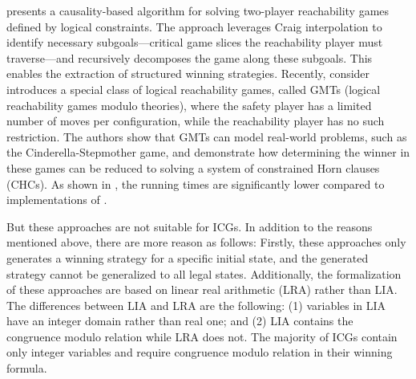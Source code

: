 \documentclass[review]{elsarticle}
\begin{document}
\citet{BaiCF2021} presents a causality-based algorithm for solving two-player reachability games defined by logical constraints. The approach leverages Craig interpolation to identify necessary subgoals—critical game slices the reachability player must traverse—and recursively decomposes the game along these subgoals. 
This enables the extraction of structured winning strategies.
Recently, \citet{FaeP2023} consider introduces a special class of logical reachability games, called GMTs (logical reachability games modulo theories), where the safety player has a limited number of moves per configuration, while the reachability player has no such restriction. 
The authors show that GMTs can model real-world problems, such as the Cinderella-Stepmother game, and demonstrate how determining the winner in these games can be reduced to solving a system of constrained Horn clauses (CHCs).
As shown in \cite{FaeP2023}, the running times are significantly lower compared to implementations of \citet{BaiCF2021}. 

But these approaches are not suitable for ICGs. In addition to the reasons mentioned above, there are more reason as follows:
Firstly, these approaches only generates a winning strategy for a specific initial state, and the generated strategy cannot be generalized to all legal states.
Additionally, the formalization of these approaches are based on linear real arithmetic (LRA) rather than LIA.
The differences between LIA and LRA are the following: (1) variables in LIA have an integer domain rather than real one; and (2) LIA contains the congruence modulo relation while LRA does not.
The majority of ICGs contain only integer variables and require congruence modulo relation in their winning formula.
\end{document}

